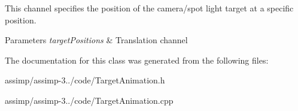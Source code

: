 This channel specifies the position of the camera/spot light target at a specific position.


\begin{DoxyParams}{Parameters}
{\em target\+Positions} & Translation channel \\
\hline
\end{DoxyParams}


The documentation for this class was generated from the following files\+:\begin{DoxyCompactItemize}
\item 
assimp/assimp-\/3../code/Target\+Animation.\+h\item 
assimp/assimp-\/3../code/Target\+Animation.\+cpp\end{DoxyCompactItemize}
